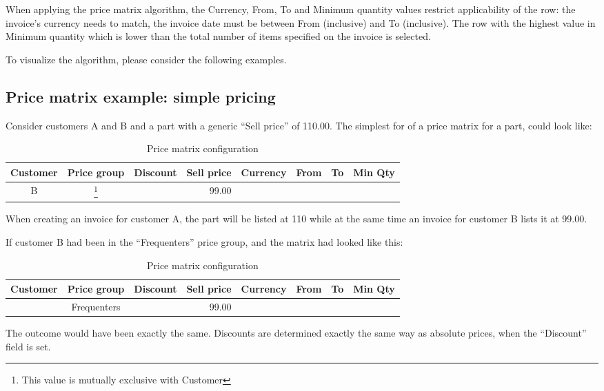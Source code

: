 When applying the price matrix algorithm, the Currency, From, To and Minimum quantity values restrict applicability
of the row: the invoice's currency needs to match, the invoice date must be between From (inclusive) and To (inclusive).
The row with the highest value in Minimum quantity which is lower than the total number of items specified on the invoice
is selected.

To visualize the algorithm, please consider the following examples.

\subsection{Price matrix example: simple pricing}

Consider customers A and B and a part with a generic ``Sell price'' of 110.00.
The simplest for of a price matrix for a part, could look like:

\begin{table}[H]
		\caption{Price matrix configuration}
\begin{tabular}{|ccrrcrrr|}
	\hline
	\bf Customer & \bf Price group & \bf Discount &  \bf Sell price & \bf Currency & \bf From & \bf To & \bf Min Qty \\
	\hline
	B & \footnote{This value is mutually exclusive with Customer} & & 99.00 & & & & \\
	\hline
\end{tabular}
\end{table}

When creating an invoice for customer A, the part will be listed at 110 while at the
same time an invoice for customer B lists it at 99.00.

If customer B had been in the ``Frequenters'' price group, and the matrix had looked like this:

\begin{table}[H]
	\caption{Price matrix configuration}
	\begin{tabular}{|ccrrcrrr|}
		\hline
		\bf Customer & \bf Price group & \bf Discount &  \bf Sell price & \bf Currency & \bf From & \bf To & \bf Min Qty \\
		\hline
		 & Frequenters & & 99.00 & & & & \\
		\hline
	\end{tabular}
\end{table}

The outcome would have been exactly the same. Discounts are determined exactly the same way
as absolute prices, when the ``Discount'' field is set.


